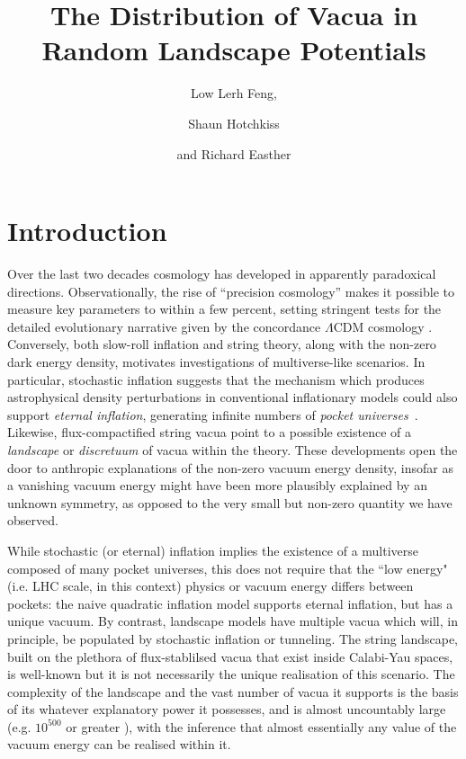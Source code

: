 \documentclass[12pt]{article}
\title{The Distribution of Vacua in Random Landscape Potentials}
\author{Low Lerh Feng,}
\author{Shaun Hotchkiss}
\author{and Richard Easther}
\affiliation{Department of Physics,\\ University of Auckland, \\Private Bag 92019,\\ Auckland, New Zealand}
\begin{document}
\maketitle

\section{Introduction}

Over the last two decades cosmology has developed in apparently paradoxical directions. Observationally, the rise of ``precision cosmology'' makes it possible to measure key parameters to within a few percent, setting stringent tests for the detailed evolutionary narrative given by the concordance $\Lambda$CDM cosmology \cite{Planck2018,DES}. Conversely, both slow-roll inflation and string theory, along with the non-zero  dark energy density,  motivates  investigations of multiverse-like scenarios. In particular, stochastic inflation \cite{Linde1986,Adshead2007} suggests that the mechanism which produces astrophysical density perturbations in conventional inflationary models could also support {\em eternal inflation\/}, generating infinite numbers of  {\em pocket universes\/}~\cite{Guth2001}. Likewise, flux-compactified string vacua point to a possible existence of a  {\em landscape\/} \cite{Susskind2003} or {\em discretuum\/} \cite{Bousso2000}   of vacua within the theory. These developments open the door to anthropic explanations of the non-zero vacuum energy density, insofar as a vanishing vacuum energy might have been more plausibly explained by an unknown symmetry, as opposed to the very small but non-zero quantity we have observed. 

While stochastic (or eternal) inflation implies the existence of a multiverse composed of many pocket universes,  this does not require that the ``low energy" (i.e. LHC scale, in this context) physics or vacuum energy differs between pockets:  the naive quadratic inflation model supports eternal inflation, but has a unique vacuum.  By contrast, landscape models have multiple vacua which will, in principle, be populated by stochastic inflation or tunneling. The string landscape, built on the plethora of flux-stablilsed vacua that exist inside Calabi-Yau spaces, is well-known but it  is not necessarily the unique realisation of this scenario. The complexity of the landscape  and the vast number of vacua it supports is the basis of its whatever explanatory power it possesses, and is almost uncountably large (e.g. $10^{500}$ or greater \cite{Douglas2003}), with the inference that almost essentially any value of the vacuum energy can be realised within it. 
 
\end{document}
